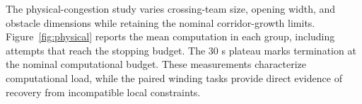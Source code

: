 The physical-congestion study varies crossing-team size, opening width, and obstacle dimensions while retaining the nominal corridor-growth limits. Figure~\ref{fig:physical} reports the mean computation in each group, including attempts that reach the stopping budget. The 30 s plateau marks termination at the nominal computational budget. These measurements characterize computational load, while the paired winding tasks provide direct evidence of recovery from incompatible local constraints.
